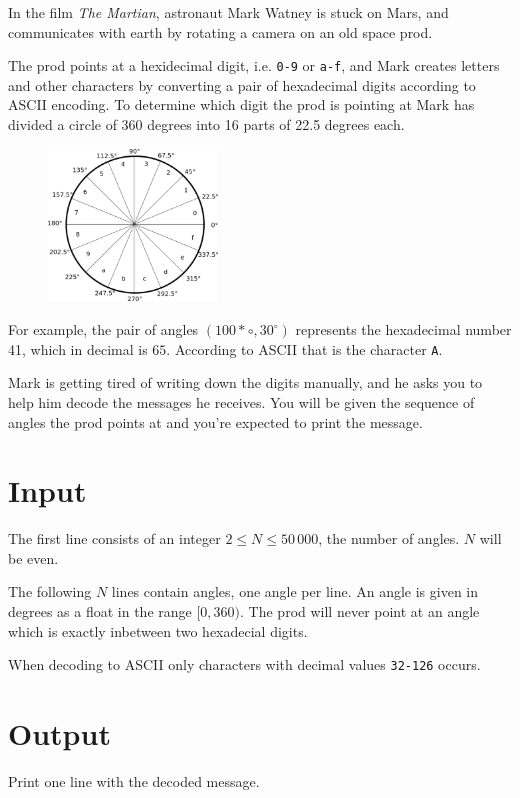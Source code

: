 
In the film \emph{The Martian}, astronaut Mark Watney is stuck on Mars, and communicates with earth by rotating a camera on an old space prod.

The prod points at a hexidecimal digit, i.e. \texttt{0-9} or \texttt{a-f}, and Mark creates letters and other characters by converting a pair
of hexadecimal digits according to ASCII encoding. To determine which digit the prod is pointing at Mark has divided a circle of 360 degrees into 16 parts of 22.5 degrees each.

\begin{figure}[h!]
  \begin{center}
    \includegraphics[width=0.4\textwidth]{angles.eps}
  \end{center}
\end{figure}

For example, the pair of angles $(100*{\circ}, 30^{\circ})$ represents the hexadecimal number 41, which in decimal is $65$.
According to ASCII that is the character \texttt{A}.

Mark is getting tired of writing down the digits manually, and he asks you to help him decode the messages he receives. You will be given the sequence of angles the prod points at and you're expected to print the message.
\section*{Input}
The first line consists of an integer $2 \le N \le 50\,000$, the number of angles. $N$ will be even.

The following $N$ lines contain angles, one angle per line. An angle is given in degrees as a float in the range $[0, 360)$.
The prod will never point at an angle which is exactly inbetween two hexadecial digits.

When decoding to ASCII only characters with decimal values \texttt{32-126} occurs.
\section*{Output}
Print one line with the decoded message.
